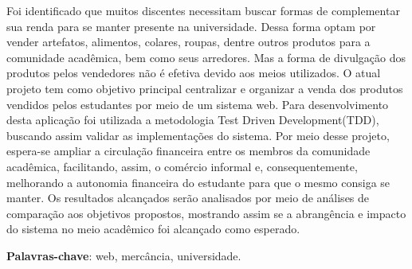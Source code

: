 
\setlength{\absparsep}{18pt} %
\begin{resumo}
Foi identificado que muitos discentes necessitam buscar formas de complementar sua renda para se manter presente na universidade. Dessa forma optam por vender artefatos, alimentos, colares, roupas, dentre outros produtos para a comunidade acadêmica, bem como seus arredores. Mas a forma de divulgação dos produtos pelos vendedores não é efetiva devido aos meios utilizados. O atual projeto tem como objetivo principal centralizar e organizar a venda dos produtos vendidos pelos estudantes por meio de um sistema web. Para desenvolvimento desta aplicação foi utilizada a metodologia Test Driven Development(TDD), buscando assim validar as implementações do sistema. Por meio desse projeto, espera-se ampliar a circulação financeira entre os membros da comunidade acadêmica, facilitando, assim, o comércio informal e, consequentemente, melhorando a autonomia financeira do estudante para que o mesmo consiga se manter. Os resultados alcançados serão analisados por meio de análises de comparação aos objetivos propostos, mostrando assim se a abrangência e impacto do sistema no meio acadêmico foi alcançado como esperado.


 \textbf{Palavras-chave}: web, mercância, universidade.
\end{resumo}


 

% 
%
%  

